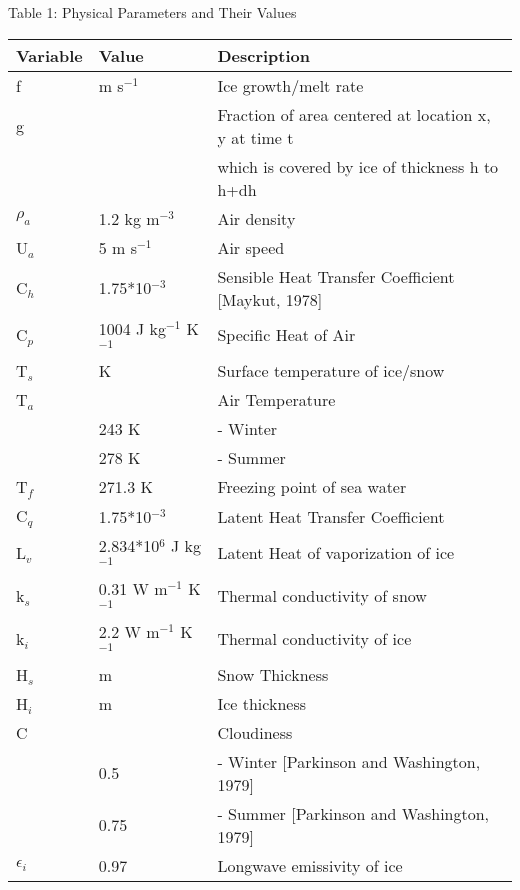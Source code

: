 \textwidth=7.0in
\textheight=10.0in
\topmargin=-0.5in


\begin{center}
Table 1: Physical Parameters and Their Values
\end{center}
\begin{tabular}{lll}
Variable & Value & Description \\
\hline
f   & m s$^{-1}$ &  Ice growth/melt rate  \\
g   &            &  Fraction of area centered at location x, y at time t \\
   &             &    which is covered by ice of thickness h to h+dh \\
$\rho_a$ & 1.2 kg m$^{-3}$ & Air density \\
U$_a$ & 5 m s$^{-1}$   & Air speed       \\
C$_h$ & 1.75*10$^{-3}$  & Sensible Heat Transfer Coefficient [Maykut, 1978] \\
C$_p$ & 1004 J kg$^{-1}$ K$^{-1}$ & Specific Heat of Air \\
T$_s$ & K & Surface temperature of ice/snow            \\
T$_a$ & & Air Temperature          \\
    & 243 K & - Winter             \\
    & 278 K & - Summer             \\
T$_f$ & 271.3 K & Freezing point of sea water        \\
C$_q$ & 1.75*10$^{-3}$  & Latent Heat Transfer Coefficient  \\
L$_v$ & 2.834*10$^{6}$ J kg$^{-1}$ & Latent Heat of vaporization of ice \\
k$_s$ & 0.31 W m$^{-1}$ K$^{-1}$ & Thermal conductivity of snow         \\
k$_i$ & 2.2  W m$^{-1}$ K$^{-1}$ & Thermal conductivity of ice          \\
H$_s$ & m  & Snow Thickness                                           \\
H$_i$ & m  & Ice thickness                                            \\
C   &  & Cloudiness                                               \\
    & 0.5 & - Winter [Parkinson and Washington, 1979]             \\
    & 0.75 & - Summer [Parkinson and Washington, 1979]              \\
$\epsilon_i$ & 0.97 & Longwave emissivity of ice       \\

\end{tabular}
